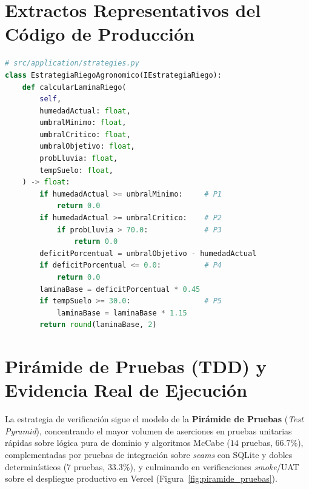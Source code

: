\documentclass[11pt,letterpaper]{report}
\begin{document}
\section{Extractos Representativos del Código de Producción}
\begin{lstlisting}[language=Python, caption={Lógica crítica con complejidad acotada en \texttt{strategies.py} y \texttt{services.py}.}]
# src/application/strategies.py
class EstrategiaRiegoAgronomico(IEstrategiaRiego):
    def calcularLaminaRiego(
        self,
        humedadActual: float,
        umbralMinimo: float,
        umbralCritico: float,
        umbralObjetivo: float,
        probLluvia: float,
        tempSuelo: float,
    ) -> float:
        if humedadActual >= umbralMinimo:     # P1
            return 0.0
        if humedadActual >= umbralCritico:    # P2
            if probLluvia > 70.0:             # P3
                return 0.0
        deficitPorcentual = umbralObjetivo - humedadActual
        if deficitPorcentual <= 0.0:          # P4
            return 0.0
        laminaBase = deficitPorcentual * 0.45
        if tempSuelo >= 30.0:                 # P5
            laminaBase = laminaBase * 1.15
        return round(laminaBase, 2)
\end{lstlisting}

\section{Pirámide de Pruebas (TDD) y Evidencia Real de Ejecución}
La estrategia de verificación sigue el modelo de la \textbf{Pirámide de Pruebas} (\textit{Test Pyramid}), concentrando el mayor volumen de aserciones en pruebas unitarias rápidas sobre lógica pura de dominio y algoritmos McCabe ($14$ pruebas, $66.7\%$), complementadas por pruebas de integración sobre \textit{seams} con SQLite y dobles determinísticos ($7$ pruebas, $33.3\%$), y culminando en verificaciones \textit{smoke}/UAT sobre el despliegue productivo en Vercel (Figura~\ref{fig:piramide_pruebas}).
\end{document}
